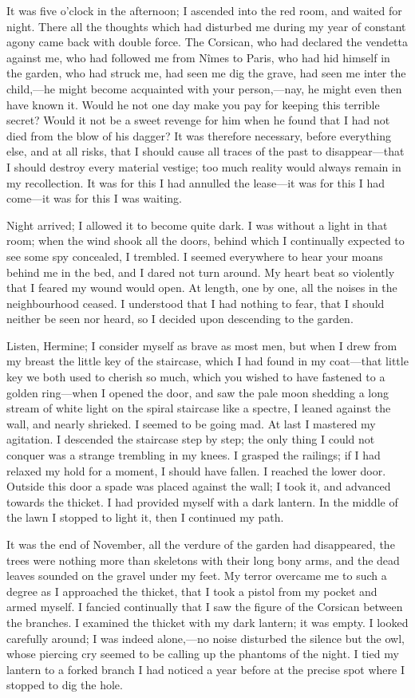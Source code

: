 It was five o'clock in the afternoon; I ascended into the red room, and waited for night. There all the thoughts which had disturbed me during my year of constant agony came back with double force. The Corsican, who had declared the vendetta against me, who had followed me from Nîmes to Paris, who had hid himself in the garden, who had struck me, had seen me dig the grave, had seen me inter the child,—he might become acquainted with your person,—nay, he might even then have known it. Would he not one day make you pay for keeping this terrible secret? Would it not be a sweet revenge for him when he found that I had not died from the blow of his dagger? It was therefore necessary, before everything else, and at all risks, that I should cause all traces of the past to disappear—that I should destroy every material vestige; too much reality would always remain in my recollection. It was for this I had annulled the lease—it was for this I had come—it was for this I was waiting. 

Night arrived; I allowed it to become quite dark. I was without a light in that room; when the wind shook all the doors, behind which I continually expected to see some spy concealed, I trembled. I seemed everywhere to hear your moans behind me in the bed, and I dared not turn around. My heart beat so violently that I feared my wound would open. At length, one by one, all the noises in the neighbourhood ceased. I understood that I had nothing to fear, that I should neither be seen nor heard, so I decided upon descending to the garden. 

Listen, Hermine; I consider myself as brave as most men, but when I drew from my breast the little key of the staircase, which I had found in my coat—that little key we both used to cherish so much, which you wished to have fastened to a golden ring—when I opened the door, and saw the pale moon shedding a long stream of white light on the spiral staircase like a spectre, I leaned against the wall, and nearly shrieked. I seemed to be going mad. At last I mastered my agitation. I descended the staircase step by step; the only thing I could not conquer was a strange trembling in my knees. I grasped the railings; if I had relaxed my hold for a moment, I should have fallen. I reached the lower door. Outside this door a spade was placed against the wall; I took it, and advanced towards the thicket. I had provided myself with a dark lantern. In the middle of the lawn I stopped to light it, then I continued my path. 

It was the end of November, all the verdure of the garden had disappeared, the trees were nothing more than skeletons with their long bony arms, and the dead leaves sounded on the gravel under my feet. My terror overcame me to such a degree as I approached the thicket, that I took a pistol from my pocket and armed myself. I fancied continually that I saw the figure of the Corsican between the branches. I examined the thicket with my dark lantern; it was empty. I looked carefully around; I was indeed alone,—no noise disturbed the silence but the owl, whose piercing cry seemed to be calling up the phantoms of the night. I tied my lantern to a forked branch I had noticed a year before at the precise spot where I stopped to dig the hole. 

